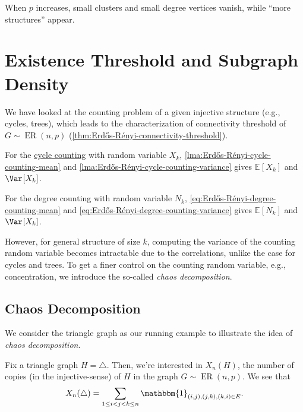 \begin{note}
	When \(p\) increases, small clusters and small degree vertices vanish, while ``more structures'' appear.
\end{note}

\section{Existence Threshold and Subgraph Density}
We have looked at the counting problem of a given injective structure (e.g., cycles, trees), which leads to the characterization of connectivity threshold of \(G \sim \operatorname{ER}(n, p) \) (\autoref{thm:Erdős-Rényi-connectivity-threshold}).

\begin{prev}[Cycle]
	For the \hyperref[prb:cycle-counting]{cycle counting} with random variable \(X_k\), \autoref{lma:Erdős-Rényi-cycle-counting-mean} and \autoref{lma:Erdős-Rényi-cycle-counting-variance} gives \(\mathbb{E}_{}[X_k] \) and \(\Var_{}[X_k] \).
\end{prev}

\begin{prev}[Degree]
	For the degree counting with random variable \(N_k\), \autoref{eq:Erdős-Rényi-degree-counting-mean} and \autoref{eq:Erdős-Rényi-degree-counting-variance} gives \(\mathbb{E}_{}[N_k] \) and \(\Var_{}[X_k] \).
\end{prev}

However, for general structure of size \(k\), computing the variance of the counting random variable becomes intractable due to the correlations, unlike the case for cycles and trees. To get a finer control on the counting random variable, e.g., concentration, we introduce the so-called \emph{chaos decomposition}.

\subsection{Chaos Decomposition}
We consider the triangle graph as our running example to illustrate the idea of \emph{chaos decomposition}.

\begin{eg}
	Fix a triangle graph \(H = \triangle\). Then, we're interested in \(X_n(H)\), the number of copies (in the injective-sense) of \(H\) in the graph \(G \sim \operatorname{ER}(n, p) \). We see that
	\[
		X_n(\triangle )
		= \sum_{1 \leq i < j < k \leq n} \mathbbm{1}_{(i, j), (j, k), (k, i) \in E}.
	\]
\end{eg}

